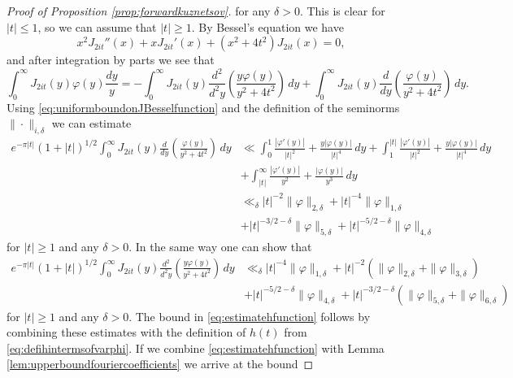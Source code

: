 \documentclass{article}
\theoremstyle{named}
\begin{document}
\begin{proof}[Proof of Proposition \ref{prop:forwardkuznetsov}]
for any $\delta > 0$. This is clear for $|t| \leq 1$, so we can assume that $|t| \geq 1$. By Bessel's equation \cite[\href{https://dlmf.nist.gov/10.2.E1}{(10.2.1)}]{dlmf} we have
\begin{equation*}
    x^2 J_{2it}''(x) + xJ_{2it}'(x) + (x^2 + 4t^2)J_{2it}(x) = 0,
\end{equation*}
and after integration by parts we see that 
\begin{equation*}
   \int_0^\infty J_{2it}(y) \varphi(y)\frac{dy}{y} = -\int_0^\infty J_{2it}(y) \frac{d^2}{d^2 y}\left(\frac{y\varphi(y)}{y^2 + 4t^2}\right) \, dy + \int_0^\infty J_{2it}(y)\frac{d}{dy}\left(\frac{\varphi(y)}{y^2 + 4t^2}\right)\, dy. 
\end{equation*}
Using \eqref{eq:uniformboundonJBesselfunction} and the definition of the seminorms $\|\cdot\|_{i, \delta}$ we can estimate 
\begin{equation*}
\begin{aligned}
    e^{-\pi |t|}(1 + |t|)^{1/2}\int_0^\infty J_{2it}(y)\frac{d}{dy}\left(\frac{\varphi(y)}{y^2 + 4t^2}\right)\, dy  & \ll \int_0^1 \frac{|\varphi'(y)|}{|t|^2} + \frac{y|\varphi(y)|}{|t|^4}\, dy + \int_1^{|t|} \frac{|\varphi'(y)|}{|t|^2} + \frac{y|\varphi(y)|}{|t|^4}\, dy\\
    & + \int_{|t|}^\infty \frac{|\varphi'(y)|}{y^2} + \frac{|\varphi(y)|}{y^3}\, dy\\
    & \ll_\delta |t|^{-2}\|\varphi\|_{2, \delta} + |t|^{-4}\|\varphi\|_{1, \delta}\\
    & + |t|^{-3/2 - \delta}\|\varphi\|_{5, \delta} + |t|^{-5/2 - \delta}\|\varphi\|_{4, \delta}
\end{aligned}
\end{equation*}
for $|t| \geq 1$ and any $\delta > 0$. In the same way one can show that
\begin{equation*}
\begin{aligned}
e^{-\pi |t|}(1 + |t|)^{1/2}\int_0^\infty J_{2it}(y) \frac{d^2}{d^2 y}\left(\frac{y\varphi(y)}{y^2 + 4t^2}\right) \, dy & \ll_\delta |t|^{-4}\|\varphi\|_{1, \delta} + |t|^{-2}(\|\varphi\|_{2, \delta} + \|\varphi\|_{3, \delta})\\
& + |t|^{-5/2 - \delta}\|\varphi\|_{4, \delta} + |t|^{-3/2 - \delta}(\|\varphi\|_{5, \delta} + \|\varphi\|_{6, \delta})
\end{aligned}
\end{equation*}
for $|t| \geq 1$ and any $\delta > 0$. The bound in \eqref{eq:estimatehfunction} follows by combining these estimates with the definition of $h(t)$ from \eqref{eq:defihintermsofvarphi}.  If we combine \eqref{eq:estimatehfunction} with Lemma \ref{lem:upperboundfouriercoefficients} we arrive at the bound

\end{proof}
\end{document}

